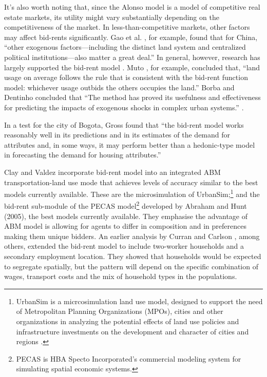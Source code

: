 It's also worth noting that, since the Alonso model is  a model of competitive real estate markets, its utility might vary substantially depending on the competitiveness of the market.  In less-than-competitive markets, other factors may affect bid-rents significantly. %
Gao et al. \cite{GaoJinlong2020BtbT}, for example,  found  that for China, ``other exogenous  factors---including the distinct land system  and centralized political institutions---also matter a great deal.'' In general, however, 
research has largely supported the bid-rent model \cite{mutoEstimationBidRent2006, wheatonBidRentApproach1977}. Muto \cite{mutoEstimationBidRent2006}, for example, concluded that, ``land usage on average follows the rule that is consistent with the bid-rent function model: whichever usage outbids the others occupies the land.''  Borba and Dentinho concluded that ``The method has proved its usefulness and effectiveness for predicting the impacts of exogenous shocks in complex urban systems.'' \cite{borbaEvaluationUrbanScenarios2016}.  

In a test for the city of Bogota, Gross \cite{grossEstimatingWillingnessPay1988} found that ``the bid-rent model works reasonably well in its predictions and in its estimates of the demand for attributes and, in some ways, it may perform better than a hedonic-type model in forecasting the demand for housing attributes.'' 

Clay and Valdez incorporate bid-rent model into an integrated ABM transportation-land use mode that achieves levels of accuracy similar to the best models currently available. These are the microsimulation of UrbanSim;\footnote{UrbanSim is a micrcosimulation land use model, designed to support the need of Metropolitan Planning Organizations (MPOs), cities and other organizations in analyzing the potential effects of land use policies and infrastructure investments on the development and character of cities and regions \cite{waddellmodellinurbandev2002}.} %
and the bid-rent sub-module of the PECAS model\footnote{PECAS is  HBA Specto Incorporated's commercial modeling system  for simulating spatial economic systems.} developed by Abraham and Hunt (2005), the best models currently available. They emphasise the advantage of ABM model is allowing for agents to differ in composition and in preferences making them unique bidders. 
An earlier analysis by Curran and Carlson \cite{curranTheoryResidentialLocation1982}, among others, extended the bid-rent model to include two-worker households and a secondary employment location. They showed that households would be expected to segregate spatially, but the pattern will depend on the specific combination of wages, transport costs and the mix of household types in the populations. 

